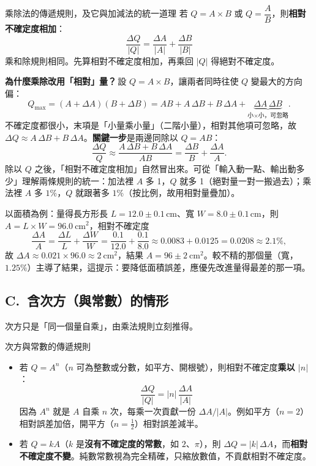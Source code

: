 \documentclass[11pt]{article}
\begin{document}
\begin{補充框}{乘除法的傳遞規則，及它與加減法的統一道理}
若 $Q = A\times B$ 或 $Q = \dfrac{A}{B}$，則\textbf{相對不確定度相加}：
$$\boxed{\ \frac{\Delta Q}{|Q|} = \frac{\Delta A}{|A|} + \frac{\Delta B}{|B|}\ }$$
乘和除規則相同。先算相對不確定度相加，再乘回 $|Q|$ 得絕對不確定度。

\textbf{為什麼乘除改用「相對」量？}\,設 $Q=A\times B$，讓兩者同時往使 $Q$ 變最大的方向偏：
$$Q_{\max}=(A+\Delta A)(B+\Delta B)=AB+A\,\Delta B+B\,\Delta A+\underbrace{\Delta A\,\Delta B}_{\text{小}\times\text{小，可忽略}}.$$
不確定度都很小，末項是「小量乘小量」（二階小量），相對其他項可忽略，故 $\Delta Q\approx A\,\Delta B+B\,\Delta A$。\textbf{關鍵一步}是兩邊同除以 $Q=AB$：
$$\frac{\Delta Q}{Q}\approx\frac{A\,\Delta B+B\,\Delta A}{AB}=\frac{\Delta B}{B}+\frac{\Delta A}{A}.$$
除以 $Q$ 之後，「相對不確定度相加」自然冒出來。可從「輸入動一點、輸出動多少」理解兩條規則的統一：加法裡 $A$ 多 1，$Q$ 就多 1（絕對量一對一搬過去）；乘法裡 $A$ 多 $1\%$，$Q$ 就跟著多 $1\%$（按比例，故用相對量疊加）。
\end{補充框}

以面積為例：量得長方形長 $L = 12.0 \pm 0.1$\,cm、寬 $W = 8.0 \pm 0.1$\,cm，則 $A=L\times W = 96.0\ \text{cm}^2$，相對不確定度
$$\frac{\Delta A}{A} = \frac{\Delta L}{L} + \frac{\Delta W}{W} = \frac{0.1}{12.0} + \frac{0.1}{8.0} \approx 0.0083 + 0.0125 = 0.0208 \approx 2.1\%,$$
故 $\Delta A \approx 0.021\times 96.0 \approx 2\ \text{cm}^2$，結果 $A = 96 \pm 2\ \text{cm}^2$。較不精的那個量（寬，$1.25\%$）主導了結果，這提示：要降低面積誤差，應優先改進量得最差的那一項。

\subsection*{\sffamily C.\ 含次方（與常數）的情形}

次方只是「同一個量自乘」，由乘法規則立刻推得。

\begin{補充框}{次方與常數的傳遞規則}
\begin{itemize}\setlength{\itemsep}{2pt}
\item 若 $Q = A^n$（$n$ 可為整數或分數，如平方、開根號），則相對不確定度\textbf{乘以 $|n|$}：
$$\boxed{\ \frac{\Delta Q}{|Q|} = |n|\,\frac{\Delta A}{|A|}\ }$$
因為 $A^n$ 就是 $A$ 自乘 $n$ 次，每乘一次貢獻一份 $\Delta A/|A|$。例如平方（$n=2$）相對誤差加倍，開平方（$n=\tfrac12$）相對誤差減半。
\item 若 $Q = kA$（$k$ 是\textbf{沒有不確定度的常數}，如 $2$、$\pi$），則 $\Delta Q = |k|\,\Delta A$，而\textbf{相對不確定度不變}。純數常數視為完全精確，只縮放數值，不貢獻相對不確定度。
\end{itemize}
\end{補充框}
\end{document}
